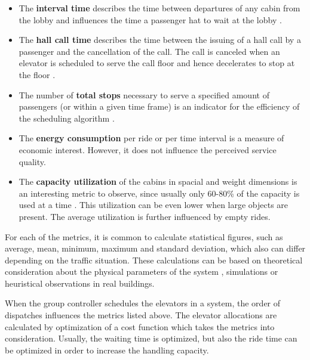 \begin{itemize}
    \item The \textbf{interval time} 
        describes the time between departures of any cabin from the lobby 
        and influences the time a passenger hat to wait at the lobby
        \autocite[][pp.8-9]{siikonen1997models}.
    
    \item The \textbf{hall call time} 
        describes the time between the issuing of a hall call by a passenger and the cancellation of the call. 
        The call is canceled when an elevator is scheduled to serve the call floor and hence decelerates to stop at the floor
        \autocite[][pp.8-9]{siikonen1997models}. 
    
    \item The number of \textbf{total stops}
        necessary to serve a specified amount of passengers (or within a given time frame) is an indicator for the efficiency of the scheduling algorithm
        \autocite[][p.~194]{unger2015aufzuege}.
    
    \item The \textbf{energy consumption} 
        per ride or per time interval is a measure of economic interest. 
        However, it does not influence the perceived service quality.
    
    \item The \textbf{capacity utilization} 
        of the cabins in spacial and weight dimensions is an interesting metric to observe, 
        since usually only 60-80\% of the capacity is used at a time 
        \autocite[][p.~194]{unger2015aufzuege}
        \autocite[][p.~7]{hakonen2003simulation}.
        This utilization can be even lower when large objects are present.
        The average utilization is further influenced by empty rides.
        
\end{itemize}

For each of the metrics, it is common to calculate statistical figures, such as average, mean, minimum, maximum and standard deviation, which also can differ depending on the traffic situation.
These calculations can be based on theoretical consideration about the physical parameters of the system \autocite[][p.~194]{unger2015aufzuege}, simulations or heuristical observations in real buildings.
 
When the group controller schedules the elevators in a system, the order of dispatches influences the metrics listed above.
The elevator allocations are calculated by optimization of a cost function which takes the metrics into consideration.
Usually, the waiting time is optimized, but also the ride time can be optimized in order to increase the handling capacity. \autocite[][p.~10]{siikonen1997models} 

